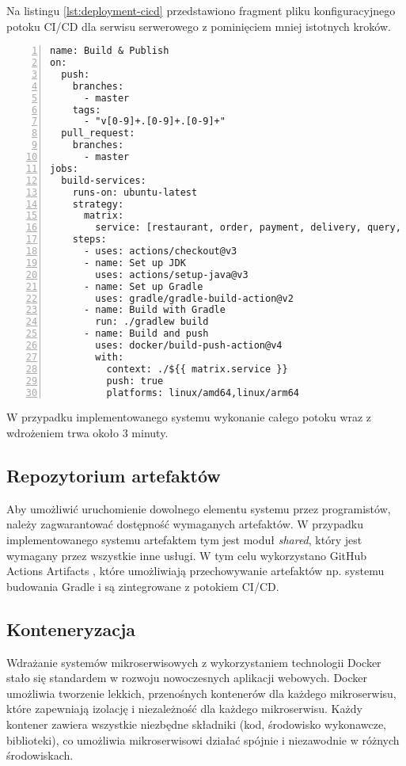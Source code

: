 Na listingu \ref{lst:deployment-cicd} przedstawiono fragment pliku konfiguracyjnego potoku CI/CD dla serwisu serwerowego z pominięciem mniej istotnych kroków.

\begin{lstlisting}[caption={Fragment potoku CI/CD},label={lst:deployment-cicd},captionpos=b,numbers=left]
name: Build & Publish
on:
  push:
    branches:
      - master
    tags:
      - "v[0-9]+.[0-9]+.[0-9]+"
  pull_request:
    branches:
      - master
jobs:
  build-services:
    runs-on: ubuntu-latest
    strategy:
      matrix:
        service: [restaurant, order, payment, delivery, query, saga]
    steps:
      - uses: actions/checkout@v3
      - name: Set up JDK
        uses: actions/setup-java@v3
      - name: Set up Gradle
        uses: gradle/gradle-build-action@v2
      - name: Build with Gradle
        run: ./gradlew build
      - name: Build and push
        uses: docker/build-push-action@v4
        with:
          context: ./${{ matrix.service }}
          push: true
          platforms: linux/amd64,linux/arm64
\end{lstlisting}

W przypadku implementowanego systemu wykonanie całego potoku wraz z wdrożeniem trwa około 3 minuty.

\subsection{Repozytorium artefaktów}

Aby umożliwić uruchomienie dowolnego elementu systemu przez programistów, należy zagwarantować dostępność wymaganych artefaktów. W przypadku implementowanego systemu artefaktem tym jest moduł \textit{shared}, który jest wymagany przez wszystkie inne usługi. W tym celu wykorzystano GitHub Actions Artifacts \cite{gaa}, które umożliwiają przechowywanie artefaktów np. systemu budowania Gradle i są zintegrowane z potokiem CI/CD.

\subsection{Konteneryzacja}

Wdrażanie systemów mikroserwisowych z wykorzystaniem technologii Docker stało się standardem w rozwoju nowoczesnych aplikacji webowych. Docker umożliwia tworzenie lekkich, przenośnych kontenerów dla każdego mikroserwisu, które zapewniają izolację i niezależność dla każdego mikroserwisu. Każdy kontener zawiera wszystkie niezbędne składniki (kod, środowisko wykonawcze, biblioteki), co umożliwia mikroserwisowi działać spójnie i niezawodnie w różnych środowiskach. 

